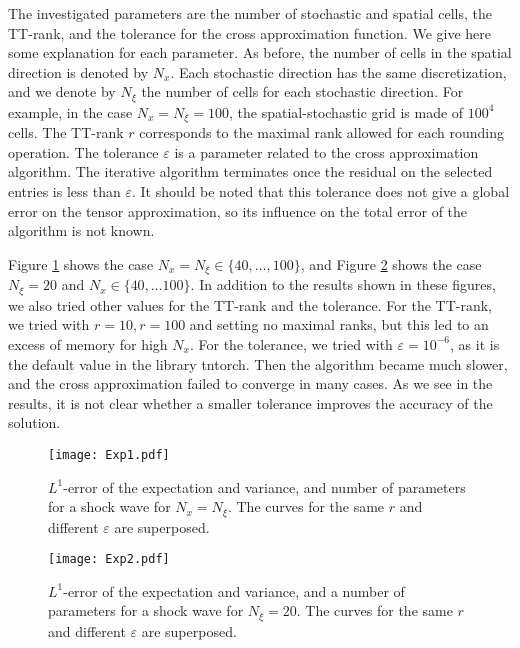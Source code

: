 \documentclass{article}
\begin{document}
The investigated parameters are the number of stochastic and spatial cells, the TT-rank, and the tolerance for the cross approximation function.
We give here some explanation for each parameter. 
As before, the number of cells in the spatial direction is denoted by $N_x$. 
Each stochastic direction has the same discretization, and we denote by $N_\xi$ the number of cells for each stochastic direction.  
For example, in the case $N_x = N_\xi = 100$, the spatial-stochastic grid is made of $100^4$ cells. 
The TT-rank $r$ corresponds to the maximal rank allowed for each rounding operation. %
The tolerance $\varepsilon$ is a parameter related to the cross approximation algorithm. 
The iterative algorithm terminates once the residual on the selected entries is less than $\varepsilon$. 
It should be noted that this tolerance does not give a global error on the tensor approximation, so its influence on the total error of the algorithm is not known.

Figure \ref{fig:Exp1} shows the case $N_x=N_\xi\in\{40,\dots,100\}$, and Figure \ref{fig:Exp2} shows the case $N_\xi = 20$ and $N_x \in \{40, \dots 100\}$. 
In addition to the results shown in these figures, we also tried other values for the TT-rank and the tolerance. 
For the TT-rank, we tried with $r=10, r=100$ and setting no maximal ranks, but this led to an excess of memory for high $N_x$. 
For the tolerance, we tried with $\varepsilon = 10^{-6}$, as it is the default value in the library tntorch. 
Then the algorithm became much slower, and the cross approximation failed to converge in many cases. 
As we see in the results, it is not clear whether a smaller tolerance improves the  accuracy of the solution. 

\begin{figure}
    \centering
    \texttt{[image: Exp1.pdf]}
    \caption{$L^1$-error of the expectation and variance, and number of parameters for a shock wave for $N_x=N_\xi$.
    The curves for the same $r$ and different $\varepsilon$ are superposed.}
    \label{fig:Exp1}
\end{figure}
\begin{figure}
\centering
\texttt{[image: Exp2.pdf]}
\caption{$L^1$-error of the expectation and variance, and a number of parameters for a shock wave for $N_\xi=20$. The curves for the same $r$ and different $\varepsilon$ are superposed.}
\label{fig:Exp2}
\end{figure}
\end{document}
